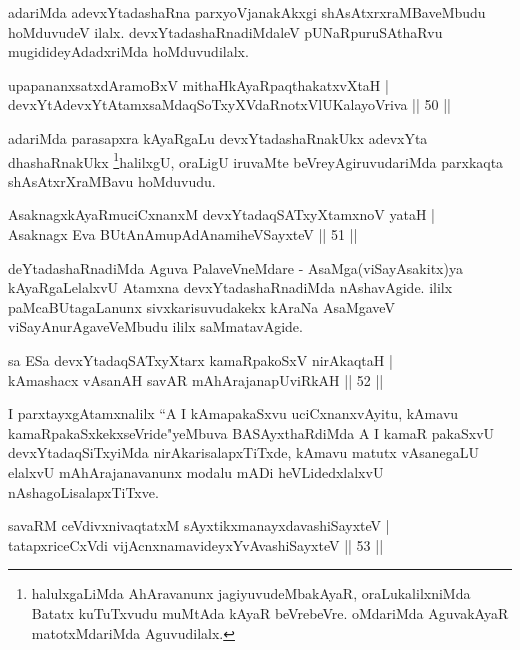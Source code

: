 \begin{artha}
adariMda adevxYtadashaRna parxyoVjanakAkxgi shAsAtxrxraMBaveMbudu hoMduvudeV ilalx. devxYtadashaRnadiMdaleV pUNaRpuruSAthaRvu mugidideyAdadxriMda hoMduvudilalx.
\end{artha}


\begin{shl}
upapananxsatxdAramoBxV mithaHkAyaRpaqthakatxvXtaH |\\
devxYtAdevxYtAtamxsaMdaqSoTxyXVdaRnotxVlUKalayoVriva \hfill || 50 ||
\end{shl}

\begin{artha}
adariMda parasapxra kAyaRgaLu devxYtadashaRnakUkx adevxYta dhashaRnakUkx  
\footnote{halulxgaLiMda AhAravanunx jagiyuvudeMbakAyaR, oraLukalilxniMda Batatx kuTuTxvudu muMtAda kAyaR beVrebeVre. oMdariMda AguvakAyaR matotxMdariMda Aguvudilalx.}halilxgU, oraLigU iruvaMte beVreyAgiruvudariMda parxkaqta shAsAtxrXraMBavu hoMduvudu.
\end{artha}

\begin{shl}
AsaknagxkAyaRmuciCxnanxM devxYtadaqSATxyX\s \s tamxnoV yataH |\\
Asaknagx Eva BUtAnAmupAdAnamiheVSayxteV \hfill || 51 ||
\end{shl}

\begin{artha}
deYtadashaRnadiMda Aguva PalaveVneMdare - AsaMga(viSayAsakitx)ya kAyaRgaLelalxvU Atamxna  devxYtadashaRnadiMda nAshavAgide. ililx paMcaBUtagaLanunx sivxkarisuvudakekx kAraNa AsaMgaveV viSayAnurAgaveVeMbudu ililx saMmatavAgide.
\end{artha}

\begin{shl}
sa ESa devxYtadaqSATxyX\s tarx kamaRpakoSxV nirAkaqtaH |\\
kAmashacx vAsanAH savAR mAhArajanapUviRkAH \hfill || 52 ||
\end{shl}

\begin{artha}
I parxtayxgAtamxnalilx ``A I kAmapakaSxvu uciCxnanxvAyitu, kAmavu kamaRpakaSxkekxseVride"yeMbuva BASAyxthaRdiMda A I kamaR pakaSxvU devxYtadaqSiTxyiMda nirAkarisalapxTiTxde, kAmavu matutx vAsanegaLU elalxvU mAhArajanavanunx modalu mADi heVLidedxlalxvU nAshagoLisalapxTiTxve.
\end{artha}

\begin{shl}
savaRM ceVdivxnivaqtatxM sAyxtikxmanayxdavashiSayxteV |\\
tatapxriceCxVdi vijAcnxnamavideyxYvAvashiSayxteV \hfill || 53 ||
\end{shl}

